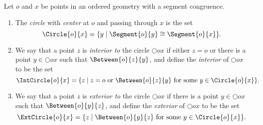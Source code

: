 \documentclass{article}
\begin{document}

\begin{dfn}[Circle]
Let $o$ and $x$ be points in an ordered geometry with a segment congruence.
\begin{enumerate}
\item The \emph{circle} with \emph{center} at $o$ and passing through $x$ is the set \[ \Circle{o}{x} = \{ y \mid \Segment{o}{y} \cong \Segment{o}{x} \}. \]
\item We say that a point $z$ is \emph{interior to} the circle $\Circle{o}{x}$ if either $z = o$ or there is a point $y \in \Circle{o}{x}$ such that $\Between{o}{z}{y}$, and define the \emph{interior} of $\Circle{o}{x}$ to be the set \[ \IntCircle{o}{x} = \{ z \mid z = o\ \mathrm{or}\ \Between{o}{z}{y}\ \mathrm{for\ some}\ y \in \Circle{o}{x} \}. \]
\item We say that a point $z$ is \emph{exterior to} the circle $\Circle{o}{x}$ if there is a point $y \in \Circle{o}{x}$ such that $\Between{o}{y}{z}$, and define the \emph{exterior} of $\Circle{o}{x}$ to be the set \[ \ExtCircle{o}{x} = \{ z \mid \Between{o}{y}{z}\ \mathrm{for\ some}\ y \in \Circle{o}{x} \}. \]
\end{enumerate}
\end{dfn}
\end{document}
